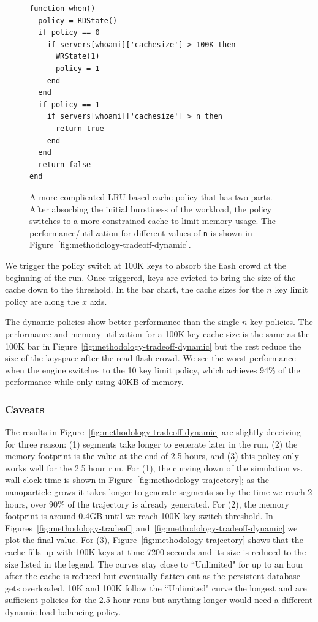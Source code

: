 \begin{figure}[t]
\footnotesize
\centering
\begin{verbatim}
function when()
  policy = RDState()
  if policy == 0
    if servers[whoami]['cachesize'] > 100K then
      WRState(1)
      policy = 1
    end
  end
  if policy == 1
    if servers[whoami]['cachesize'] > n then
      return true
    end
  end
  return false
end
\end{verbatim}
\caption{A more complicated LRU-based cache policy that has two parts. After
absorbing the initial burstiness of the workload, the policy switches to a more
constrained cache to limit memory usage. The performance/utilization for
different values of \texttt{n} is shown in
Figure~\ref{fig:methodology-tradeoff-dynamic}. \label{src:lru-dyn}}
\end{figure}

We trigger the policy switch at 100K keys to absorb the flash crowd at the
beginning of the run. Once triggered, keys are evicted to bring the size of the
cache down to the threshold.  In the bar chart, the cache sizes for the \(n\)
key limit policy are along the \(x\) axis.

The dynamic policies show better performance than the single \(n\) key
policies. The performance and memory utilization for a 100K key cache size is
the same as the 100K bar in Figure~\ref{fig:methodology-tradeoff-dynamic} but
the rest reduce the size of the keyspace after the read flash crowd.  We see
the worst performance when the engine switches to the 10 key limit policy,
which achieves 94\% of the performance while only using 40KB of memory. 

\subsubsection*{Caveats}

The results in Figure~\ref{fig:methodology-tradeoff-dynamic} are slightly
deceiving for three reason: (1) segments take longer to generate later in the
run, (2) the memory footprint is the value at the end of 2.5 hours, and (3)
this policy only works well for the 2.5 hour run.  For (1), the curving down of
the simulation vs. wall-clock time is shown in
Figure~\ref{fig:methodology-trajectory}; as the nanoparticle grows it takes
longer to generate segments so by the time we reach 2 hours, over 90\% of the
trajectory is already generated.  For (2), the memory footprint is around 0.4GB
until we reach 100K key switch threshold. In
Figures~\ref{fig:methodology-tradeoff}
and~\ref{fig:methodology-tradeoff-dynamic} we plot the final value. For (3),
Figure~\ref{fig:methodology-trajectory} shows that the cache fills up with 100K
keys at time 7200 seconds and its size is reduced to the size listed in the
legend.  The curves stay close to ``Unlimited" for up to an hour after the
cache is reduced but eventually flatten out as the persistent database gets
overloaded. 10K and 100K follow the ``Unlimited" curve the longest and are
sufficient policies for the 2.5 hour runs but anything longer would need a
different dynamic load balancing policy.


